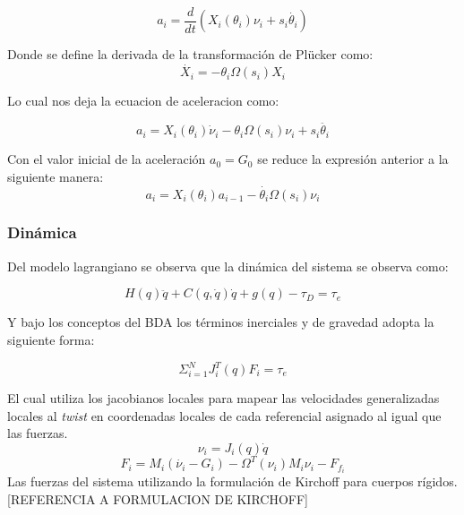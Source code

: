 \begin{equation}
a_i = \frac{d}{dt} (X_i(\theta_i)\nu_i + s_i\dot{\theta_i})
\end{equation}

Donde se define la derivada de la transformación de Plücker como:
\begin{equation}
\dot{X_i} = -\theta_i \Omega(s_i)X_i
\end{equation}

Lo cual nos deja la ecuacion de aceleracion como:

\begin{equation}
a_i = X_i(\theta_i)\dot{\nu}_i - \theta_i \Omega(s_i)\nu_i+ s_i\ddot{\theta_i}
\end{equation}

Con el valor inicial de la aceleración $a_0 = G_0$ se reduce la expresión anterior a la siguiente manera:
\begin{equation}
a_i = X_i(\theta_i)a_{i-1} - \dot{\theta_i}\Omega(s_i)\nu_i
\end{equation}

\subsubsection{Dinámica}

Del modelo lagrangiano se observa que la dinámica del sistema se observa como:

\begin{equation}\label{eq: lagrangiano_modelo}
H(q)\ddot{q} + C(q,\dot{q})\dot{q} +g(q) - \tau_D = \tau_e
\end{equation}

Y bajo los conceptos del BDA los términos inerciales y de gravedad adopta la siguiente forma:

\begin{equation}
\Sigma_{i=1}^N J_i^T(q)F_i = \tau_e
\end{equation}

El cual utiliza los jacobianos locales para mapear las velocidades generalizadas locales al \emph{twist} en coordenadas locales de cada referencial asignado al igual que las fuerzas.
\begin{equation} \label{eq: twist_loc}
\nu_i = J_i(q)\dot{q}
\end{equation}
\begin{equation}
F_i = M_i(\dot{\nu_i} - G_i) - \Omega^T(\nu_i)M_i\nu_i - F_{f_{i}}
\end{equation}
Las fuerzas del sistema utilizando la formulación de Kirchoff para cuerpos rígidos.[REFERENCIA A FORMULACION DE KIRCHOFF]

